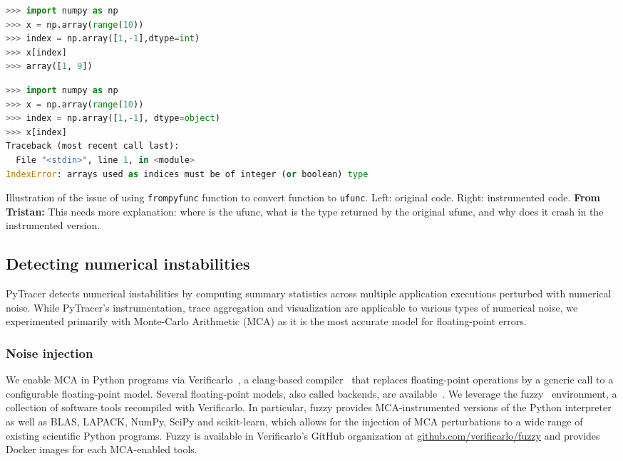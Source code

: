 \documentclass[11pt]{article}
\newcommand{\tristan}[1]{\color{orange}\textbf{From Tristan:} #1\color{black}\xspace}
\newcommand{\pytracer}[0]{PyTracer\xspace}
\begin{document}
\begin{listing}
\begin{minipage}[t]{0.4\linewidth}
    \begin{lstlisting}[language=Python,style=customPython]
>>> import numpy as np
>>> x = np.array(range(10))
>>> index = np.array([1,-1],dtype=int)
>>> x[index]
>>> array([1, 9])
    \end{lstlisting}
\end{minipage}
\begin{minipage}[t]{0.4\linewidth}
    \begin{lstlisting}[language=Python,style=customPython]
>>> import numpy as np
>>> x = np.array(range(10))
>>> index = np.array([1,-1], dtype=object)
>>> x[index]
Traceback (most recent call last):
  File "<stdin>", line 1, in <module>
IndexError: arrays used as indices must be of integer (or boolean) type
    \end{lstlisting}
\end{minipage}
\caption{Illustration of the issue of using \texttt{frompyfunc} function to convert function to \texttt{ufunc}. Left: original code. Right: instrumented code. \tristan{This needs more explanation: where is the ufunc, what is the type returned by the original ufunc, and why does it crash in the instrumented version.}}
    \label{fig:numpy_array_index_issue}
\end{listing}

\subsection{Detecting numerical instabilities}

\pytracer detects numerical instabilities by computing summary statistics across multiple application executions perturbed with numerical noise. While \pytracer's instrumentation, trace aggregation and visualization are applicable to various types of numerical noise, we experimented primarily with Monte-Carlo Arithmetic (MCA) as it is the most accurate model for floating-point errors.

\subsubsection{Noise injection}
\label{sec:fuzzy}

We enable MCA in Python programs via Verificarlo~\cite{verificarlo}, a clang-based compiler~\cite{lattner2008llvm}
that replaces floating-point operations by a generic call to
a configurable floating-point model. Several floating-point models, also called
backends, are available~\cite{chatelain2019automatic,chatelain2019outils}.
We leverage the fuzzy~\cite{kiar2020comparing} environment, a collection of software tools recompiled with Verificarlo. In particular, fuzzy provides MCA-instrumented versions of the Python interpreter as well as BLAS, LAPACK, NumPy, SciPy and scikit-learn, 
which allows for the injection of MCA perturbations to a wide range of existing scientific Python programs. Fuzzy is available in Verificarlo's GitHub organization at \href{https://github.com/verificarlo/fuzzy}{\url{github.com/verificarlo/fuzzy}} 
and provides Docker images for each MCA-enabled tools.
\end{document}
